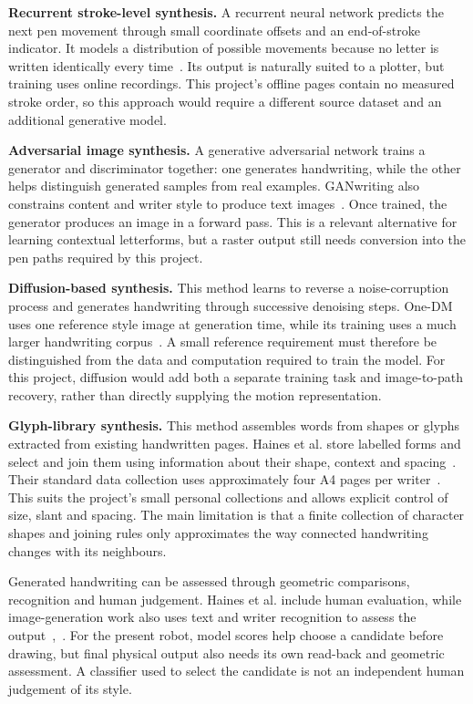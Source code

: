 \textbf{Recurrent stroke-level synthesis.} A recurrent neural network predicts the next pen movement through small coordinate offsets and an end-of-stroke indicator. It models a distribution of possible movements because no letter is written identically every time~\cite[pp.~18--20]{graves2013}. Its output is naturally suited to a plotter, but training uses online recordings. This project's offline pages contain no measured stroke order, so this approach would require a different source dataset and an additional generative model.

\textbf{Adversarial image synthesis.} A generative adversarial network trains a generator and discriminator together: one generates handwriting, while the other helps distinguish generated samples from real examples. GANwriting also constrains content and writer style to produce text images~\cite[pp.~3--7]{kang2020}. Once trained, the generator produces an image in a forward pass. This is a relevant alternative for learning contextual letterforms, but a raster output still needs conversion into the pen paths required by this project.

\textbf{Diffusion-based synthesis.} This method learns to reverse a noise-corruption process and generates handwriting through successive denoising steps. One-DM uses one reference style image at generation time, while its training uses a much larger handwriting corpus~\cite[pp.~3--5, 9]{dai2024}. A small reference requirement must therefore be distinguished from the data and computation required to train the model. For this project, diffusion would add both a separate training task and image-to-path recovery, rather than directly supplying the motion representation.

\textbf{Glyph-library synthesis.} This method assembles words from shapes or glyphs extracted from existing handwritten pages. Haines et al. store labelled forms and select and join them using information about their shape, context and spacing~\cite[pp.~4--8]{haines2016}. Their standard data collection uses approximately four A4 pages per writer~\cite[p.~4]{haines2016}. This suits the project's small personal collections and allows explicit control of size, slant and spacing. The main limitation is that a finite collection of character shapes and joining rules only approximates the way connected handwriting changes with its neighbours.

Generated handwriting can be assessed through geometric comparisons, recognition and human judgement. Haines et al. include human evaluation, while image-generation work also uses text and writer recognition to assess the output~\cite[pp.~12--14]{haines2016},~\cite[pp.~8--9]{kang2020}. For the present robot, model scores help choose a candidate before drawing, but final physical output also needs its own read-back and geometric assessment. A classifier used to select the candidate is not an independent human judgement of its style.

